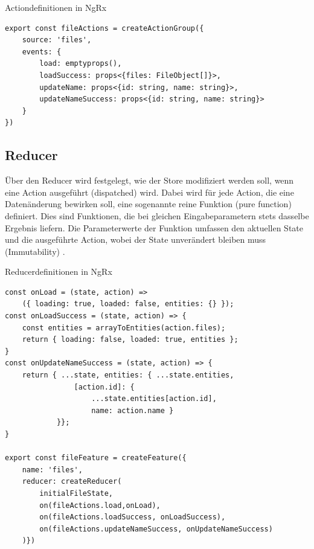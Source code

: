 \documentclass[12pt]{book}          %
\begin{document}
\begin{algorithm}
\caption{Actiondefinitionen in NgRx}
\label{alg-actiondefinition-in-ng-rx}
\begin{lstlisting}
export const fileActions = createActionGroup({
    source: 'files',
    events: {
        load: emptyprops(),
        loadSuccess: props<{files: FileObject[]}>,
        updateName: props<{id: string, name: string}>,
        updateNameSuccess: props<{id: string, name: string}>
    }
})
\end{lstlisting}
\end{algorithm}

\subsection{Reducer}
\label{subsec-reducer}

Über den Reducer wird festgelegt, wie der Store modifiziert werden soll, wenn eine Action ausgeführt (dispatched) wird. Dabei wird für jede Action, die eine Datenänderung bewirken soll, eine sogenannte reine Funktion (pure function) definiert. Dies sind Funktionen, die bei gleichen Eingabeparametern stets dasselbe Ergebnis liefern. Die Parameterwerte der Funktion umfassen den aktuellen State und die ausgeführte Action, wobei der State unverändert bleiben muss (Immutability) \cite[21]{mcfarlane_managing_2019}.


\begin{algorithm}
\caption{Reducerdefinitionen in NgRx}
\label{alg-reducerdefinition-in-ng-rx}
\begin{lstlisting}
const onLoad = (state, action) => 
    ({ loading: true, loaded: false, entities: {} });    
const onLoadSuccess = (state, action) => {
    const entities = arrayToEntities(action.files);
    return { loading: false, loaded: true, entities };
}
const onUpdateNameSuccess = (state, action) => {
    return { ...state, entities: { ...state.entities, 
                [action.id]: {
                    ...state.entities[action.id],
                    name: action.name }
            }}; 
}

export const fileFeature = createFeature({
    name: 'files',
    reducer: createReducer(
        initialFileState,
        on(fileActions.load,onLoad),
        on(fileActions.loadSuccess, onLoadSuccess),
        on(fileActions.updateNameSuccess, onUpdateNameSuccess)
    )})
\end{lstlisting}
\end{algorithm}
\end{document}

